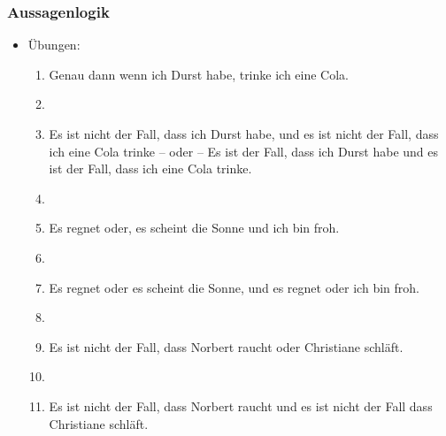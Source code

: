 \begin{frame}
\frametitle{Aussagenlogik}

\begin{itemize}
	\item Übungen:

\vspace{1em}

	\begin{enumerate}
		\item Genau dann wenn ich Durst habe, trinke ich eine Cola.
		\item[]
		\item Es ist nicht der Fall, dass ich Durst habe, und es ist nicht der Fall, dass ich eine Cola trinke -- oder -- Es ist der Fall, dass ich Durst habe und es ist der Fall, dass ich eine Cola trinke.
		\item[]
		\item Es regnet oder, es scheint die Sonne und ich bin froh.
		\item[]
		\item Es regnet oder es scheint die Sonne, und es regnet oder ich bin froh.
		\item[]
		\item Es ist nicht der Fall, dass Norbert raucht oder Christiane schläft.
		\item[]
		\item Es ist nicht der Fall, dass Norbert raucht und es ist nicht der Fall dass Christiane schläft.
	\end{enumerate}
		
\end{itemize}


\end{frame}



